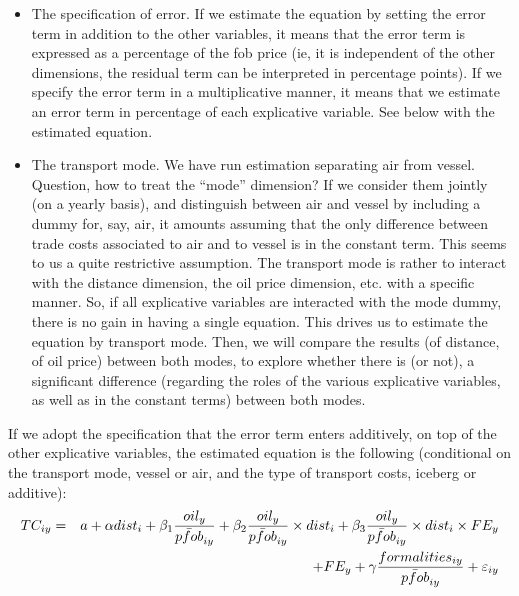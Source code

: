 \documentclass[a4paper,11pt]{article}
\begin{document}
\begin{itemize}
\item The specification of error. If we estimate the equation by setting the error term in addition to the other variables, it means that the error term is expressed as a percentage of the fob price (ie, it is independent of the other dimensions, the residual term can be interpreted in percentage points). If we specify the error term in a multiplicative manner, it means that we estimate an error term in percentage of each explicative variable. See below with the estimated equation.

\item The transport mode. We have run estimation separating air from vessel. Question, how to treat the ``mode'' dimension? If we consider them jointly (on a yearly basis), and distinguish between air and vessel by including a dummy for, say, air, it amounts assuming that the only difference between trade costs associated to air and to vessel is in the constant term. This seems to us a quite restrictive assumption. The transport mode is rather to interact with the distance dimension, the oil price dimension, etc. with a specific manner. So, if all explicative variables are interacted with the mode dummy, there is no gain in having a single equation. This drives us to estimate the equation by transport mode. Then, we will compare the results (of distance, of oil price) between both modes, to explore whether there is (or not), a significant difference (regarding the roles of the various explicative variables, as well as in the constant terms) between both modes.

\end{itemize}

If we adopt the specification that the error term enters additively, on top of the other explicative variables, the estimated equation is the following (conditional on the transport mode, vessel or air, and the type of transport costs, iceberg or additive):
\begin{eqnarray}
TC_{iy} &=& a + \alpha dist_{i}+ \beta_1\frac{oil_{y}}{\bar{pfob}_{iy}} + \beta_2\frac{oil_{y}}{\bar{pfob}_{iy}}\times dist_{i} + \beta_3\frac{oil_{y}}{\bar{pfob}_{iy}}\times dist_{i}\times FE_y \notag \\
 &&+ FE_y + \gamma\frac{formalities_{iy}}{\bar{pfob}_{iy}} + \varepsilon_{iy} \label{eq:2dstage}
\end{eqnarray}
\end{document}
